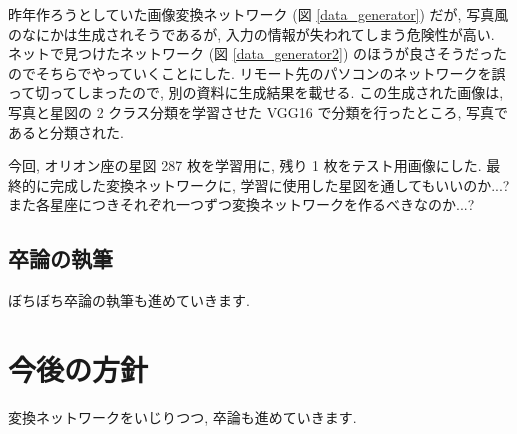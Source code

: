 \documentclass[onecolumn]{jarticle}     %
\begin{document}
昨年作ろうとしていた画像変換ネットワーク (図 \ref{data_generator}) だが, 写真風のなにかは生成されそうであるが, 入力の情報が失われてしまう危険性が高い. 
ネットで見つけたネットワーク (図 \ref{data_generator2}) のほうが良さそうだったのでそちらでやっていくことにした. 
リモート先のパソコンのネットワークを誤って切ってしまったので, 別の資料に生成結果を載せる. この生成された画像は, 写真と星図の 2 クラス分類を学習させた VGG16 で分類を行ったところ, 写真であると分類された. 

今回, オリオン座の星図 287 枚を学習用に, 残り 1 枚をテスト用画像にした. 最終的に完成した変換ネットワークに, 学習に使用した星図を通してもいいのか...? また各星座につきそれぞれ一つずつ変換ネットワークを作るべきなのか...? 

\subsection{卒論の執筆}
ぼちぼち卒論の執筆も進めていきます. 

\section{今後の方針}
変換ネットワークをいじりつつ, 卒論も進めていきます. 


%  
%  
\end{document}
